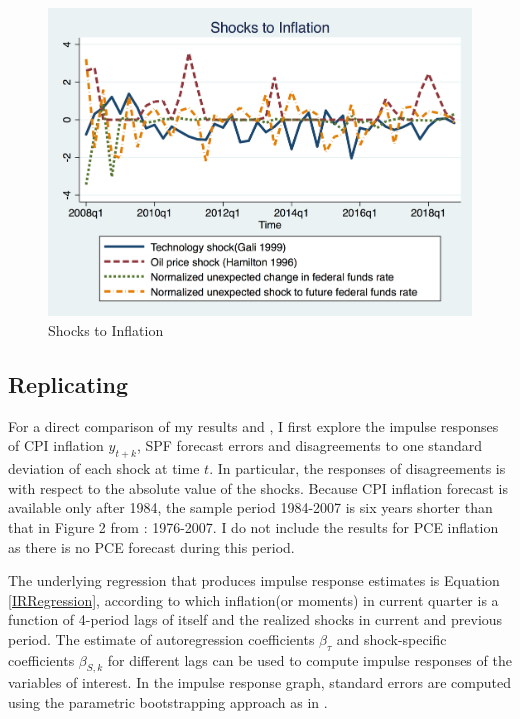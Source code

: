\documentclass[]{article}
\begin{document}
	\begin{figure}[ht]
		\centering
		\includegraphics[width=12cm]{figures/inf_shocksQ.png}
		\caption{ Shocks to Inflation}
		\label{Inflationshocks}
	\end{figure}
	
	\subsection{Replicating \citet{coibion2012can}}
	
	For a direct comparison of my results and \citet{coibion2012can}, I first explore the impulse responses of CPI inflation $y_{t+k}$, SPF forecast errors and disagreements to one standard deviation of each shock at time $t$. In particular, the responses of disagreements is with respect to the absolute value of the shocks. Because CPI inflation forecast is available only after 1984, the sample period 1984-2007 is six years shorter than that in Figure 2 from \citet{coibion2012can}: 1976-2007. I do not include the results for PCE inflation as there is no PCE forecast during this period. 
	
	The underlying regression that produces impulse response estimates is  Equation \ref{IRRegression}, according to which inflation(or moments) in current quarter is a function of 4-period lags of itself  and the realized shocks in current and previous period. The estimate of autoregression coefficients $\beta_\tau$ and shock-specific coefficients $\beta_{S,k}$ for different lags can be used to compute impulse responses of the variables of interest. In the impulse response graph, standard errors are computed using the parametric bootstrapping approach as in \citet{coibion2012can}. 
	
\end{document}
